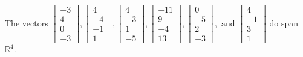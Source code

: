 \begin{exercise}
\begin{exerciseStatement}
  \end{exerciseStatement}
  \begin{exerciseAnswer}
   The vectors \(\left[\begin{array}{r}
-3 \\
4 \\
0 \\
-3
\end{array}\right] , \left[\begin{array}{r}
4 \\
-4 \\
-1 \\
1
\end{array}\right] , \left[\begin{array}{r}
4 \\
-3 \\
1 \\
-5
\end{array}\right] , \left[\begin{array}{r}
-11 \\
9 \\
-4 \\
13
\end{array}\right] , \left[\begin{array}{r}
0 \\
-5 \\
2 \\
-3
\end{array}\right] , \text{ and } \left[\begin{array}{r}
4 \\
-1 \\
3 \\
1
\end{array}\right]\) 
  	 do  
	span \(\mathbb{R}^4\).
  


  \end{exerciseAnswer}
\end{exercise}